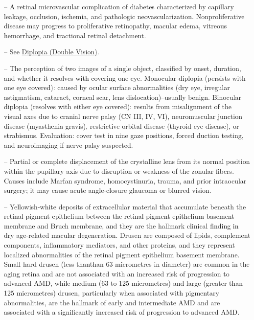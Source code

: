 -- A retinal microvascular complication of diabetes characterized by capillary leakage, occlusion, ischemia, and pathologic neovascularization. Nonproliferative disease may progress to proliferative retinopathy, macular edema, vitreous hemorrhage, and tractional retinal detachment.

-- See \hyperlink{Diplopia (Double Vision)}{Diplopia (Double Vision)}.

-- The perception of two images of a single object, classified by onset, duration, and whether it resolves with covering one eye. Monocular diplopia (persists with one eye covered): caused by ocular surface abnormalities (dry eye, irregular astigmatism, cataract, corneal scar, lens dislocation)--usually benign. Binocular diplopia (resolves with either eye covered): results from misalignment of the visual axes due to cranial nerve palsy (CN III, IV, VI), neuromuscular junction disease (myasthenia gravis), restrictive orbital disease (thyroid eye disease), or strabismus. Evaluation: cover test in nine gaze positions, forced duction testing, and neuroimaging if nerve palsy suspected.

-- Partial or complete displacement of the crystalline lens from its normal position within the pupillary axis due to disruption or weakness of the zonular fibers. Causes include Marfan syndrome, homocystinuria, trauma, and prior intraocular surgery; it may cause acute angle-closure glaucoma or blurred vision.

-- Yellowish-white deposits of extracellular material that accumulate beneath the retinal pigment epithelium between the retinal pigment epithelium basement membrane and Bruch membrane, and they are the hallmark clinical finding in dry age-related macular degeneration. Drusen are composed of lipids, complement components, inflammatory mediators, and other proteins, and they represent localized abnormalities of the retinal pigment epithelium basement membrane. Small hard drusen (less thanthan 63 micrometres in diameter) are common in the aging retina and are not associated with an increased risk of progression to advanced AMD, while medium (63 to 125 micrometres) and large (greater than 125 micrometres) drusen, particularly when associated with pigmentary abnormalities, are the hallmark of early and intermediate AMD and are associated with a significantly increased risk of progression to advanced AMD.

